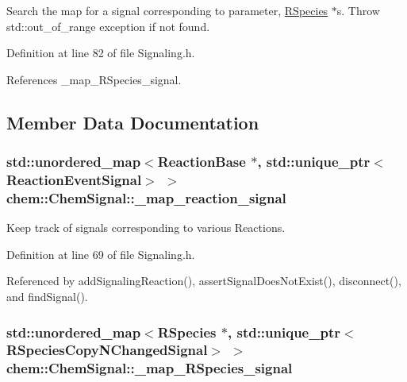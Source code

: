 Search the map for a signal corresponding to parameter, \hyperlink{classchem_1_1RSpecies}{R\-Species} $\ast$s. Throw std\-::out\-\_\-of\-\_\-range exception if not found. 



Definition at line 82 of file Signaling.\-h.



References \-\_\-map\-\_\-\-R\-Species\-\_\-signal.



\subsection{Member Data Documentation}
\hypertarget{classchem_1_1ChemSignal_a5a8fb8af001c1575256ee7b671c42ea3}{
\subsubsection[{\-\_\-map\-\_\-reaction\-\_\-signal}]{\setlength{\rightskip}{0pt plus 5cm}std\-::unordered\-\_\-map$<${\bf Reaction\-Base} $\ast$, std\-::unique\-\_\-ptr$<${\bf Reaction\-Event\-Signal}$>$ $>$ {\bf chem\-::\-Chem\-Signal\-::\-\_\-map\-\_\-reaction\-\_\-signal}}}\label{classchem_1_1ChemSignal_a5a8fb8af001c1575256ee7b671c42ea3}


Keep track of signals corresponding to various Reactions. 



Definition at line 69 of file Signaling.\-h.



Referenced by add\-Signaling\-Reaction(), assert\-Signal\-Does\-Not\-Exist(), disconnect(), and find\-Signal().

\hypertarget{classchem_1_1ChemSignal_a7721fb9395d65c7de08108163a3d4cdb}{
\subsubsection[{\-\_\-map\-\_\-\-R\-Species\-\_\-signal}]{\setlength{\rightskip}{0pt plus 5cm}std\-::unordered\-\_\-map$<${\bf R\-Species} $\ast$, std\-::unique\-\_\-ptr$<${\bf R\-Species\-Copy\-N\-Changed\-Signal}$>$ $>$ {\bf chem\-::\-Chem\-Signal\-::\-\_\-map\-\_\-\-R\-Species\-\_\-signal}}}\label{classchem_1_1ChemSignal_a7721fb9395d65c7de08108163a3d4cdb}


